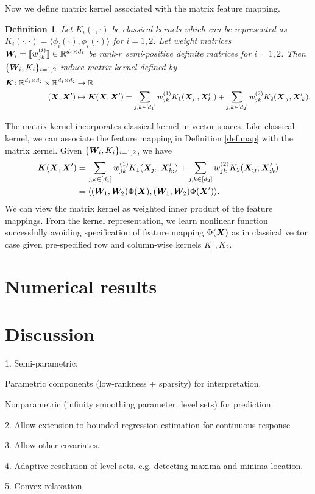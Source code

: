 \documentclass[12pt]{article}
\newtheorem{defn}{Definition}
\begin{document}
Now we define matrix kernel associated with the matrix feature mapping.
\begin{defn}\label{def:kernel}
Let $K_i(\cdot,\cdot)$ be classical kernels which can be represented as $K_i(\cdot,\cdot) = \langle \phi_i(\cdot),\phi_i(\cdot)\rangle$ for $i=1,2$. Let weight matrices $\bm{W}_i = \llbracket w^{(i)}_{jk} \rrbracket\in\mathbb{R}^{d_i\times d_i}$ be  rank-$r$ semi-positive definite matrices for $i = 1,2$. Then $\{\bm{W}_i,K_i\}_{i=1,2}$  induce matrix kernel defined by
\begin{align}
    \bm K\colon\mathbb{R}^{d_1\times d_2}\times \mathbb{R}^{d_1\times d_2}&\rightarrow \mathbb{R}\\
    (\bm X,\bm X')&\mapsto \bm K(\bm X,\bm X')  = \sum_{j,k\in[d_1]}w^{(1)}_{jk}K_1(\bm X_{j:},\bm X'_{k:})+\sum_{j,k\in[d_2]}w^{(2)}_{jk}K_2(\bm X_{:j},\bm X'_{:k}).
\end{align}
\end{defn}
The matrix kernel incorporates classical kernel in vector spaces. Like classical kernel, we can associate the feature mapping in Definition \ref{def:map} with the matrix kernel. Given $\{\bm{W}_i,K_i\}_{i=1,2}$, we have
\begin{align}\bm K(\bm X,\bm X')& = \sum_{j,k\in[d_1]}w^{(1)}_{jk}K_1(\bm X_{j:},\bm X'_{k:})+\sum_{j,k\in[d_2]}w^{(2)}_{jk}K_2(\bm X_{:j},\bm X'_{:k}) \\
&=\langle (\bm{W}_1,\bm{W}_2)\Phi(\bm X),(\bm{W}_1,\bm{W}_2)\Phi(\bm X')\rangle.
\end{align}
We can view the matrix kernel as weighted inner product of the feature mappings. From the kernel representation, we learn nonlinear function successfully  avoiding specification of feature mapping $\Phi(\bm X)$ as in classical vector case given pre-specified row and column-wise kernels $K_1,K_2$.


\section{Numerical results}\label{sec:numerical}
\section{Discussion}
1. Semi-parametric: 

Parametric components (low-rankness + sparsity) for interpretation. 

Nonparametric (infinity smoothing parameter, level sets) for prediction

2. Allow extension to bounded regression estimation for continuous response

3. Allow other covariates. 

4. Adaptive resolution of level sets. e.g. detecting maxima and minima location. 

5. Convex relaxation




\end{document}
